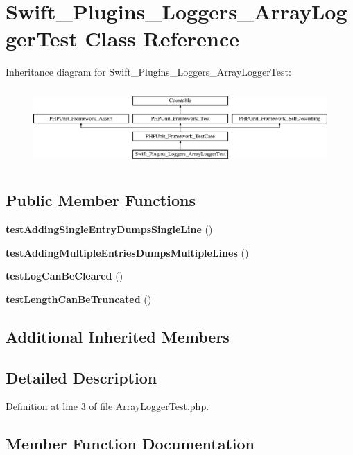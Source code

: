 \section{Swift\+\_\+\+Plugins\+\_\+\+Loggers\+\_\+\+Array\+Logger\+Test Class Reference}
\label{class_swift___plugins___loggers___array_logger_test}
Inheritance diagram for Swift\+\_\+\+Plugins\+\_\+\+Loggers\+\_\+\+Array\+Logger\+Test\+:\begin{figure}[H]
\begin{center}
\leavevmode
\includegraphics[height=2.974767cm]{class_swift___plugins___loggers___array_logger_test}
\end{center}
\end{figure}
\subsection*{Public Member Functions}
\begin{DoxyCompactItemize}
\item 
{\bf test\+Adding\+Single\+Entry\+Dumps\+Single\+Line} ()
\item 
{\bf test\+Adding\+Multiple\+Entries\+Dumps\+Multiple\+Lines} ()
\item 
{\bf test\+Log\+Can\+Be\+Cleared} ()
\item 
{\bf test\+Length\+Can\+Be\+Truncated} ()
\end{DoxyCompactItemize}
\subsection*{Additional Inherited Members}


\subsection{Detailed Description}


Definition at line 3 of file Array\+Logger\+Test.\+php.



\subsection{Member Function Documentation}
